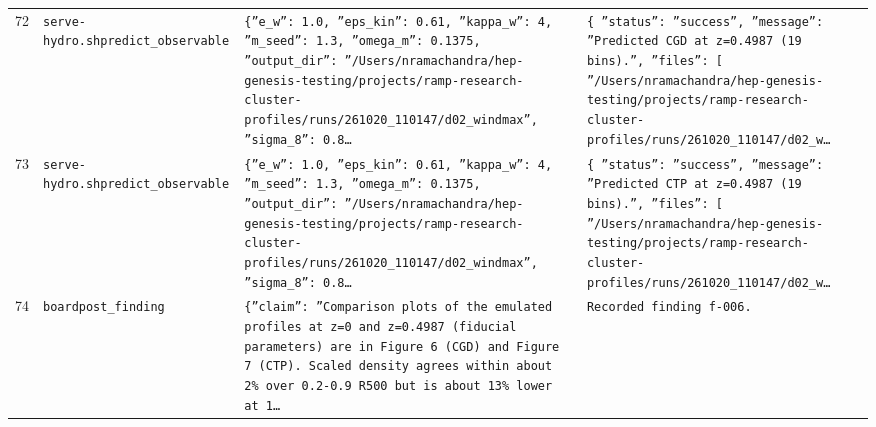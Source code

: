 \documentclass[11pt,a4paper]{article}
\begin{document}
\begin{longtable}{@{}p{}p{}p{}p{}@{}}
72 & \texttt{serve-hydro.sh}\newline\texttt{predict\_\allowbreak{}observable} & \texttt{\{''e\_\allowbreak{}w'':\allowbreak{} 1.0,\allowbreak{} ''eps\_\allowbreak{}kin'':\allowbreak{} 0.61,\allowbreak{} ''kappa\_\allowbreak{}w'':\allowbreak{} 4,\allowbreak{} ''m\_\allowbreak{}seed'':\allowbreak{} 1.3,\allowbreak{} ''omega\_\allowbreak{}m'':\allowbreak{} 0.1375,\allowbreak{} ''output\_\allowbreak{}dir'':\allowbreak{} ''/\allowbreak{}Users/\allowbreak{}nramachandra/\allowbreak{}hep-genesis-testing/\allowbreak{}projects/\allowbreak{}ramp-research-cluster-profiles/\allowbreak{}runs/\allowbreak{}261020\_\allowbreak{}110147/\allowbreak{}d02\_\allowbreak{}windmax'',\allowbreak{} ''sigma\_\allowbreak{}8'':\allowbreak{} 0.8\ldots{}\allowbreak{}} & \texttt{\{   ''status'':\allowbreak{} ''success'',\allowbreak{}   ''message'':\allowbreak{} ''Predicted CGD at z=\allowbreak{}0.4987 (19 bins)\allowbreak{}.'',\allowbreak{}   ''files'':\allowbreak{} [     ''/\allowbreak{}Users/\allowbreak{}nramachandra/\allowbreak{}hep-genesis-testing/\allowbreak{}projects/\allowbreak{}ramp-research-cluster-profiles/\allowbreak{}runs/\allowbreak{}261020\_\allowbreak{}110147/\allowbreak{}d02\_\allowbreak{}w\ldots{}\allowbreak{}} \\
73 & \texttt{serve-hydro.sh}\newline\texttt{predict\_\allowbreak{}observable} & \texttt{\{''e\_\allowbreak{}w'':\allowbreak{} 1.0,\allowbreak{} ''eps\_\allowbreak{}kin'':\allowbreak{} 0.61,\allowbreak{} ''kappa\_\allowbreak{}w'':\allowbreak{} 4,\allowbreak{} ''m\_\allowbreak{}seed'':\allowbreak{} 1.3,\allowbreak{} ''omega\_\allowbreak{}m'':\allowbreak{} 0.1375,\allowbreak{} ''output\_\allowbreak{}dir'':\allowbreak{} ''/\allowbreak{}Users/\allowbreak{}nramachandra/\allowbreak{}hep-genesis-testing/\allowbreak{}projects/\allowbreak{}ramp-research-cluster-profiles/\allowbreak{}runs/\allowbreak{}261020\_\allowbreak{}110147/\allowbreak{}d02\_\allowbreak{}windmax'',\allowbreak{} ''sigma\_\allowbreak{}8'':\allowbreak{} 0.8\ldots{}\allowbreak{}} & \texttt{\{   ''status'':\allowbreak{} ''success'',\allowbreak{}   ''message'':\allowbreak{} ''Predicted CTP at z=\allowbreak{}0.4987 (19 bins)\allowbreak{}.'',\allowbreak{}   ''files'':\allowbreak{} [     ''/\allowbreak{}Users/\allowbreak{}nramachandra/\allowbreak{}hep-genesis-testing/\allowbreak{}projects/\allowbreak{}ramp-research-cluster-profiles/\allowbreak{}runs/\allowbreak{}261020\_\allowbreak{}110147/\allowbreak{}d02\_\allowbreak{}w\ldots{}\allowbreak{}} \\
74 & \texttt{board}\newline\texttt{post\_\allowbreak{}finding} & \texttt{\{''claim'':\allowbreak{} ''Comparison plots of the emulated profiles at z=\allowbreak{}0 and z=\allowbreak{}0.4987 (fiducial parameters)\allowbreak{} are in Figure 6 (CGD)\allowbreak{} and Figure 7 (CTP)\allowbreak{}. Scaled density agrees within about 2\% over 0.2-0.9 R500 but is about 13\% lower at 1\ldots{}\allowbreak{}} & \texttt{Recorded finding f-006.} \\

\end{longtable}
\end{document}
